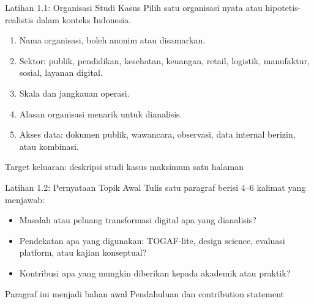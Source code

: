 \documentclass[aspectratio=169, table]{beamer}
\newcommand{\takeaway}[1]{%
  \vspace{4pt}
  {\footnotesize #1}
}
\begin{document}
\begin{frame}{Latihan 1.1: Organisasi Studi Kasus}
  \vspace{10pt}
  Pilih satu organisasi nyata atau hipotetis-realistis dalam konteks Indonesia.

  \vspace{8pt}
  \begin{enumerate}
    \item Nama organisasi, boleh anonim atau disamarkan.
    \item Sektor: publik, pendidikan, kesehatan, keuangan, retail, logistik, manufaktur, sosial, layanan digital.
    \item Skala dan jangkauan operasi.
    \item Alasan organisasi menarik untuk dianalisis.
    \item Akses data: dokumen publik, wawancara, observasi, data internal berizin, atau kombinasi.
  \end{enumerate}

  \takeaway{Target keluaran: deskripsi studi kasus maksimum satu halaman}
\end{frame}

\begin{frame}{Latihan 1.2: Pernyataan Topik Awal}
  \vspace{10pt}
  Tulis satu paragraf berisi 4--6 kalimat yang menjawab:

  \vspace{8pt}
  \begin{itemize}
    \item Masalah atau peluang transformasi digital apa yang dianalisis?
    \item Pendekatan apa yang digunakan: TOGAF-lite, design science, evaluasi platform, atau kajian konseptual?
    \item Kontribusi apa yang mungkin diberikan kepada akademik atau praktik?
  \end{itemize}

  \takeaway{Paragraf ini menjadi bahan awal Pendahuluan dan contribution statement}
\end{frame}
\end{document}
